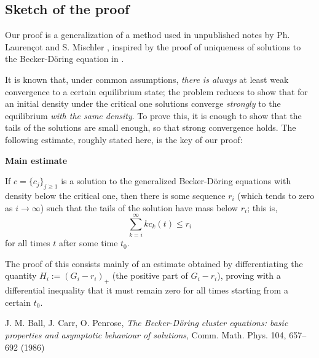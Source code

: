 \documentclass{article}
\def\to{\rightarrow}
\begin{document}
\begin{multicols}{3}
\section*{Sketch of the proof}

Our proof is a generalization of a method used in unpublished notes by
Ph. Lauren\c{c}ot and S. Mischler \cite{LM}, inspired by the proof of
uniqueness of solutions to the Becker-D\"oring equation in
\cite{LM02e}.

It is known that, under common assumptions, \emph{there is always} at
least weak convergence to a certain equilibrium state;
\textcolor{rojo}{the problem reduces to show that for an initial
  density under the critical one solutions converge \emph{strongly} to
  the equilibrium \emph{with the same density}}. To prove this, it is
enough to show that the tails of the solutions are small enough, so
that strong convergence holds. The following estimate, roughly stated
here, is the key of our proof:

\noindent
\colorbox{marronrp3}{
  \begin{minipage}[t]{.96\linewidth}
    \vspace{.2cm}
    \centerline{\huge \textbf{Main estimate}}
    \vspace{.05cm}

    \Large
    If $c = \{c_j\}_{j \geq 1}$ is a solution to the generalized
    Becker-Döring equations with density below the critical one, then
    there is some sequence $r_i$ (which tends to zero as $i \to
    \infty$) such that the tails of the solution have mass below
    $r_i$; this is,
    \begin{equation*}
      \sum_{k=i}^\infty k c_k(t) \leq r_i
    \end{equation*}
    for all times $t$ after some time $t_0$.
    \\\hspace{.05cm}
  \end{minipage}
}

\vspace{.5cm}

The proof of this consists mainly of an estimate obtained by
differentiating the quantity $H_i := (G_i-r_i)_+$ (the positive part
of $G_i - r_i$), proving with a differential inequality that it must
remain zero for all times starting from a certain $t_0$.
%
\small
\begin{thebibliography}{}

 J. M. Ball, J. Carr, O. Penrose, \emph{The
    Becker-D\"oring cluster equations: basic properties and asymptotic
    behaviour of solutions}, Comm. Math. Phys. 104, 657--692 (1986)


\end{thebibliography}
\end{multicols}
\end{document}
